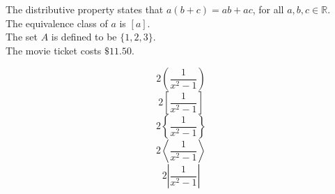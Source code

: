 \documentclass[11pt]{article}
\begin{document}

The distributive property states that $a(b+c)=ab+ac$, for all $a, b, c \in \mathbb{R}$. \\[6pt]
The equivalence class of $a$ is $[a]$. \\[6pt]
The set $A$ is defined to be $\{1, 2, 3\}$. \\[6pt]
The movie ticket costs $\$11.50$.

$$2\left(\frac{1}{x^2-{1}}\right)$$
$$2\left[\frac{1}{x^2-{1}}\right]$$
$$2\left\{\frac{1}{x^2-{1}}\right\}$$
$$2\left\langle\frac{1}{x^2-{1}}\right\rangle$$
$$2\left|\frac{1}{x^2-{1}}\right|$$
\end{document}
